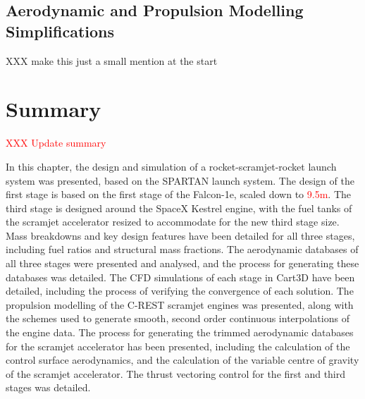 \subsection{Aerodynamic and Propulsion Modelling Simplifications}

XXX make this just a small mention at the start


	\section{Summary}	
	\textcolor{red}{XXX Update summary}
	
	
	
	
	
	
	In this chapter, the design and simulation of a rocket-scramjet-rocket launch system was presented, based on the SPARTAN launch system. 
	The design of the first stage is based on the first stage of the Falcon-1e, scaled down to \textcolor{red}{9.5m}. The third stage is designed around the SpaceX Kestrel engine, with the fuel tanks of the scramjet accelerator resized to accommodate for the new third stage size. 
	 Mass breakdowns and key design features have been detailed for all three stages, including fuel ratios and structural mass fractions.
	 The aerodynamic databases of all three stages were presented and analysed, and the process for generating these databases was detailed. 
	 The CFD simulations of each stage in Cart3D have been detailed, including the process of verifying the convergence of each solution. 
	 The propulsion modelling of the C-REST scramjet engines was presented, along with the schemes used to generate smooth, second order continuous interpolations of the engine data. 
	The process for generating the trimmed aerodynamic databases for the scramjet accelerator has been presented, including the calculation of the control surface aerodynamics, and the calculation of the variable centre of gravity of the scramjet accelerator. The thrust vectoring control for the first and third stages was detailed.
	
	